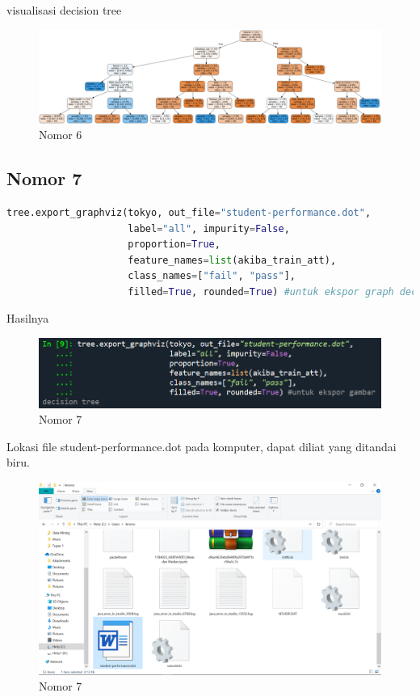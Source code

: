 \par visualisasi decision tree

\begin{figure}[H]
    \centering
    \includegraphics[width=12cm]{figures/chapter2/25.png}
    \caption{Nomor 6}
\end{figure}

\subsection{Nomor 7}

\begin{lstlisting}[language=Python]
tree.export_graphviz(tokyo, out_file="student-performance.dot",
                     label="all", impurity=False,
                     proportion=True,
                     feature_names=list(akiba_train_att),
                     class_names=["fail", "pass"],
                     filled=True, rounded=True) #untuk ekspor graph decision tree
\end{lstlisting}

\par Hasilnya

\begin{figure}[H]
    \centering
    \includegraphics[width=12cm]{figures/chapter2/26.PNG}
    \caption{Nomor 7}
\end{figure}

\par Lokasi file student-performance.dot pada komputer, dapat diliat yang ditandai biru.

\begin{figure}[H]
    \centering
    \includegraphics[width=12cm]{figures/chapter2/27.PNG}
    \caption{Nomor 7}
\end{figure}

